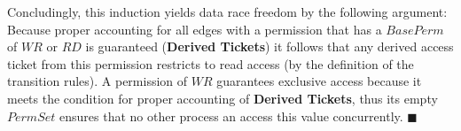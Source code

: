	Concludingly, this induction yields data race freedom by the following
	argument: Because proper accounting for all edges with a permission that has
	a $\mathit{BasePerm}$ of $\mathit{WR}$ or $\mathit{RD}$ is guaranteed
	(\textbf{Derived Tickets}) it follows that any derived access ticket from
	this permission restricts to read access (by the definition of the
	transition rules). A permission of $\mathit{WR}$ guarantees exclusive access
	because it meets the condition for proper accounting of \textbf{Derived
	Tickets}, thus its empty $\mathit{PermSet}$ ensures that no other process
	an access this value concurrently.  $\blacksquare$
